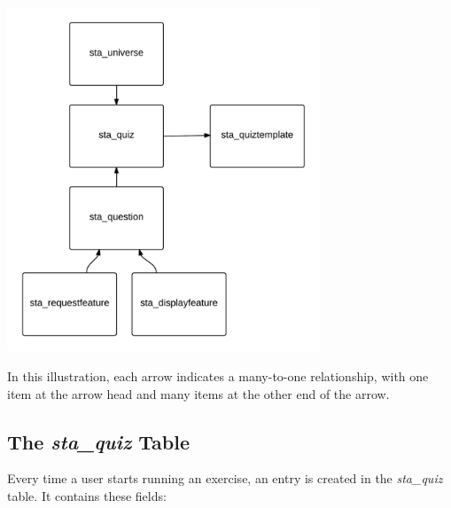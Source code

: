 \documentclass[11pt,oneside,a4paper]{memoir}
\begin{document}
\begin{center}
\includegraphics[width=0.7\textwidth]{sta_tables.png}
\end{center}

In this illustration, each arrow indicates a many-to-one relationship, with one item at the arrow
head and many items at the other end of the arrow.


\subsection{The \emph{sta\_quiz} Table}\label{sec-staquiz}

Every time a user starts running an exercise, an entry is created in the \emph{sta\_quiz} table. It
contains these fields:
\end{document}
